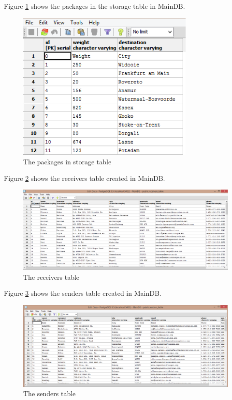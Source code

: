 \documentclass[paper=a4, fontsize=11pt]{scrartcl} %
\numberwithin{equation}{section} %
\numberwithin{figure}{section} %
\numberwithin{table}{section} %
\begin{document}
Figure \ref{PackageStorageTable} shows the packages in the storage table in MainDB.
\begin{figure}[hbt!]
\centering
\includegraphics[width=3.5in]{pictures/screenshots/packagesstoragescreen.png}
\caption{The packages in storage table}
\label{PackageStorageTable}
\end{figure}

Figure \ref{ReceiversTable} shows the receivers table created in MainDB.
\begin{figure}[hbt!]
\centering
\includegraphics[width=4.5in]{pictures/screenshots/receiversscreen.png}
\caption{The receivers table}
\label{ReceiversTable}
\end{figure}

Figure \ref{SendersTable} shows the senders table created in MainDB.
\begin{figure}[hbt!]
\centering
\includegraphics[width=4.5in]{pictures/screenshots/sendersscreen.png}
\caption{The senders table}
\label{SendersTable}
\end{figure}
\end{document}
